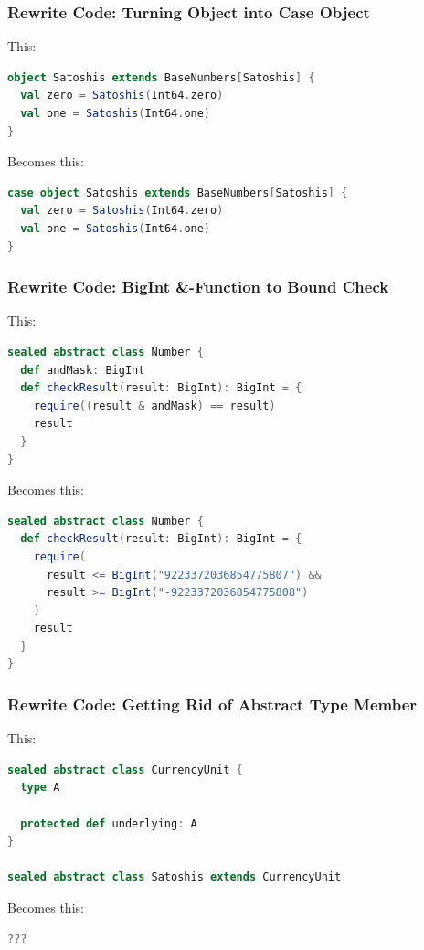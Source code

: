 \documentclass{beamer}
\begin{document}
\begin{frame}[fragile]
\frametitle{Rewrite Code: Turning Object into Case Object}
This:
\begin{lstlisting}[language=Scala]
object Satoshis extends BaseNumbers[Satoshis] {
  val zero = Satoshis(Int64.zero)
  val one = Satoshis(Int64.one)
}
\end{lstlisting}

Becomes this:
\begin{lstlisting}[language=Scala]
case object Satoshis extends BaseNumbers[Satoshis] {
  val zero = Satoshis(Int64.zero)
  val one = Satoshis(Int64.one)
}
\end{lstlisting}
\end{frame}


\begin{frame}[fragile]
\frametitle{Rewrite Code: BigInt \&-Function to Bound Check}
This:
\begin{lstlisting}[language=Scala]
sealed abstract class Number {
  def andMask: BigInt
  def checkResult(result: BigInt): BigInt = {
    require((result & andMask) == result)
    result
  }
}  
\end{lstlisting}
Becomes this:
\begin{lstlisting}[language=Scala]
sealed abstract class Number {
  def checkResult(result: BigInt): BigInt = {
    require(
      result <= BigInt("9223372036854775807") &&
      result >= BigInt("-9223372036854775808")
    )
    result
  }
}
\end{lstlisting}
\end{frame}

\begin{frame}[fragile]
\frametitle{Rewrite Code: Getting Rid of Abstract Type Member}
This:
\begin{lstlisting}[language=Scala]
sealed abstract class CurrencyUnit {
  type A

  protected def underlying: A
}

sealed abstract class Satoshis extends CurrencyUnit  
\end{lstlisting}

Becomes this:
\begin{lstlisting}[language=Scala]
  ???
\end{lstlisting}
\end{frame}


\end{document}
